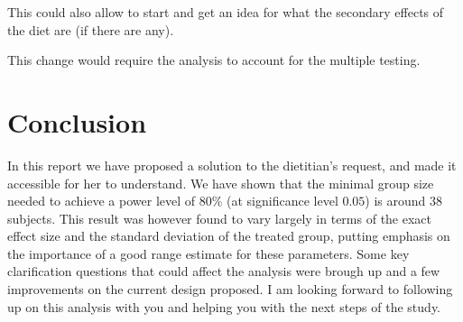 \documentclass[a4paper, 12pt,oneside]{article}
\begin{document}
	This could also allow to start and get an idea for what the secondary effects of the diet are (if there are any).

	This change would require the analysis to account for the multiple testing.
	\section{Conclusion}
	In this report we have proposed a solution to the dietitian's request, and made it accessible for her to understand. We have shown that the minimal group size needed to achieve a power level of $80\%$ (at significance level $0.05$) is around $38$ subjects. This result was however found to vary largely in terms of the exact effect size and the standard deviation of the treated group, putting emphasis on the importance of a good range estimate for these parameters. Some key clarification questions that could affect the analysis were brough up and a few improvements on the current design proposed. I am looking forward to following up on this analysis with you and helping you with the next steps of the study.
\end{document}
